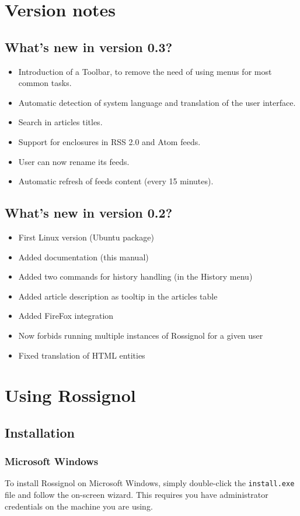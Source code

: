 \documentclass[11pt]{article} %
\begin{document}
\section{Version notes}

\subsection{What's new in version 0.3?}
\begin{itemize}
\item Introduction of a Toolbar, to remove the need of using menus for most 
common tasks.
\item Automatic detection of system language and translation of the user 
interface.
\item Search in articles titles.
\item Support for enclosures in RSS 2.0 and Atom feeds.
\item User can now rename its feeds.
\item Automatic refresh of feeds content (every 15 minutes).
\end{itemize}

\subsection{What's new in version 0.2?}
\begin{itemize}
\item First Linux version (Ubuntu package)
\item Added documentation (this manual)
\item Added two commands for history handling (in the History menu)
\item Added article description as tooltip in the articles table
\item Added FireFox integration 
\item Now forbids running multiple instances of Rossignol for a given user 
\item Fixed translation of HTML entities
\end{itemize}

\section{Using Rossignol}
\subsection{Installation}
\subsubsection{Microsoft Windows}
To install Rossignol on Microsoft Windows, simply double-click the 
\texttt{install.exe}
file and follow the on-screen wizard. This requires you have administrator 
credentials on the machine you are using. 
\end{document}
